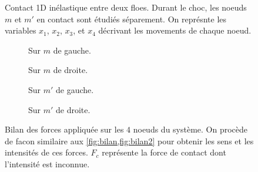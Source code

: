 \begin{figure}[!h]
    \centering
    \caption{Contact 1D inélastique entre deux floes. Durant le choc, les noeuds $m$ et $m'$ en contact sont étudiés séparement. On représnte les variables $x_1$, $x_2$, $x_3$, et $x_4$ décrivant les movements de chaque noeud.}
    \label{fig:contact1d3}
\end{figure}


\begin{figure}[!h]
    \begin{subfigure}[b]{0.30\textwidth}
        \centering
        \caption{Sur $m$ de gauche.}
        \label{fig:bilan13}
    \end{subfigure}
    \begin{subfigure}[b]{0.35\textwidth}
        \centering
        \caption{Sur $m$ de droite.}
        \label{fig:bilan23}
    \end{subfigure}
    \begin{subfigure}[b]{0.35\textwidth}
        \centering
        \caption{Sur $m'$ de gauche.}
        \label{fig:bilan33}
    \end{subfigure}
    \begin{subfigure}[b]{0.30\textwidth}
        \centering
        \caption{Sur $m'$ de droite.}
        \label{fig:bilan43}
    \end{subfigure}
       \caption{Bilan des forces appliquée sur les $4$ noeuds du système. On procède de facon similaire aux \cref{fig:bilan,fig:bilan2} pour obtenir les sens et les intensités de ces forces. $F_c$ représente la force de contact dont l'intensité est inconnue.}
       \label{fig:bilan3}
\end{figure}

